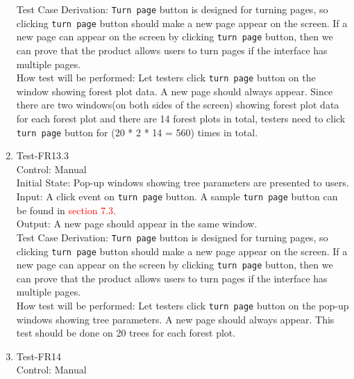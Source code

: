 \documentclass[12pt, titlepage]{article}
\begin{document}
\begin{enumerate}
Test Case Derivation: \verb|Turn page| button is designed for turning pages, so 
clicking \verb|turn page| button should make a new page appear on the screen.  If 
a new page can appear on the screen by clicking \verb|turn page| button, then we can
prove that the product allows users to turn pages if the interface has multiple
pages.\\
					
How test will be performed:  Let testers click \verb|turn page| button on the window 
showing forest plot data. A new page should always appear. Since there are two
windows(on both sides of the screen) showing forest plot data for each forest plot
and there are 14 forest plots in total, testers need to 
click \verb|turn page| button for (20 * 2 * 14 = 560) times in total. 

\item{Test-FR13.3\\}
Control: Manual\\ 

Initial State: Pop-up windows showing tree parameters are presented to users.\\

Input: A click event on \verb|turn page| button. A sample \verb|turn page| button
can be found in \textcolor{red}{section 7.3}.\\

Output: A new page should appear in the same window.\\

Test Case Derivation: \verb|Turn page| button is designed for turning pages, so 
clicking \verb|turn page| button should make a new page appear on the screen.  If 
a new page can appear on the screen by clicking \verb|turn page| button, then we can
prove that the product allows users to turn pages if the interface has multiple
pages.\\
					
How test will be performed:  Let testers click \verb|turn page| button on the 
pop-up windows showing tree parameters. A new page should always appear. This test 
should be done on 20 trees for each forest plot.

\item{Test-FR14\\}
Control: Manual\\ 


\end{enumerate}
\end{document}
